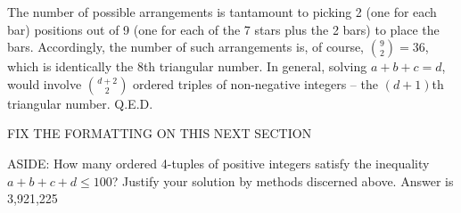 The number of possible arrangements is tantamount to picking 2 (one for each bar) positions out of 9 (one for each of the 7 stars plus the 2 bars) to place the bars. Accordingly, the number of such arrangements is, of course, \(\binom{9}{2} = 36\), which is identically the 8th triangular number. In general, solving \(a + b + c = d\), would involve \(\binom{d+2}{2}\) ordered triples of non-negative integers – the \((d + 1)\)th triangular number. Q.E.D.


\begin{center}
FIX THE FORMATTING ON THIS NEXT SECTION
\end{center}

ASIDE: How many ordered 4-tuples of positive integers satisfy the inequality \(a + b + c + d \leq 100\)? Justify your solution by methods discerned above.                                                                                  Answer is 3,921,225 
